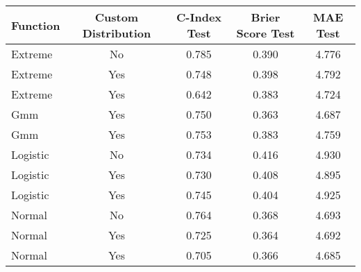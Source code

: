 \begin{tabular}{lcccc}
\toprule
Function & Custom Distribution & C-Index Test & Brier Score Test & MAE Test \\
\midrule
Extreme & No & 0.785 & 0.390 & 4.776 \\
Extreme & Yes & 0.748 & 0.398 & 4.792 \\
Extreme & Yes & 0.642 & 0.383 & 4.724 \\
Gmm & Yes & 0.750 & 0.363 & 4.687 \\
Gmm & Yes & 0.753 & 0.383 & 4.759 \\
Logistic & No & 0.734 & 0.416 & 4.930 \\
Logistic & Yes & 0.730 & 0.408 & 4.895 \\
Logistic & Yes & 0.745 & 0.404 & 4.925 \\
Normal & No & 0.764 & 0.368 & 4.693 \\
Normal & Yes & 0.725 & 0.364 & 4.692 \\
Normal & Yes & 0.705 & 0.366 & 4.685 \\
\bottomrule
\end{tabular}
